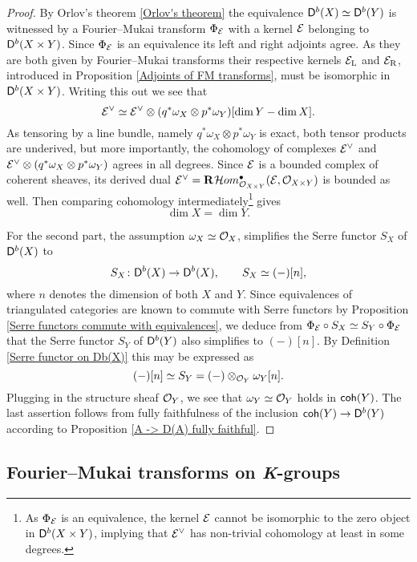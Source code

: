 \begin{proof}
    By Orlov's theorem \ref{Orlov's theorem} the equivalence $\mathsf{D}^b(X) \simeq \mathsf{D}^b(Y)$ is witnessed by a Fourier--Mukai transform $\Phi_{\mathcal E}$ with a kernel $\mathcal E$ belonging to $\mathsf{D}^b(X \times Y)$. Since $\Phi_{\mathcal E}$ is an equivalence its left and right adjoints agree. As they are both given by Fourier--Mukai transforms their respective kernels $\mathcal E_\mathrm{L}$ and $\mathcal E_\mathrm{R}$, introduced in Proposition \ref{Adjoints of FM transforms}, must be isomorphic in $\mathsf{D}^b(X \times Y)$. Writing this out we see that
    \[
        \mathcal E^\vee \simeq \mathcal E^\vee \otimes (q^*\omega_X \otimes p^*\omega_Y)[\dim Y - \dim X].
    \]
    As tensoring by a line bundle, namely $q^*\omega_X \otimes p^*\omega_Y$ is exact, both tensor products are underived, but more importantly, the cohomology of complexes $\mathcal E^\vee$ and ${\mathcal E^\vee \otimes (q^*\omega_X \otimes p^*\omega_Y)}$ agrees in all degrees. Since $\mathcal E$ is a bounded complex of coherent sheaves, its derived dual $\E^\vee = \rderived{}{\localhom[X \times Y]^\bullet(\E, \struct{X \times Y})}$ is bounded as well. Then comparing cohomology intermediately\footnote{As $\Phi_{\mathcal E}$ is an equivalence, the kernel $\mathcal E$ cannot be isomorphic to the zero object in $\mathsf{D}^b(X \times Y)$, implying that $\mathcal E^\vee$ has non-trivial cohomology at least in some degrees.} gives 
    \[
        \dim X = \dim Y.
    \]
    
    For the second part, the assumption $\omega_X \simeq {\mathcal{O}_{X}}$, simplifies the Serre functor $S_X$ of $\mathsf{D}^b(X)$ to 
    \[
        S_X \colon \mathsf{D}^b(X) \to \mathsf{D}^b(X), \qquad S_X \simeq (-)[n], 
    \]
    where $n$ denotes the dimension of both $X$ and $Y$. Since equivalences of triangulated categories are known to commute with Serre functors by Proposition \ref{Serre functors commute with equivalences}, we deduce from $\Phi_{\mathcal E} \circ S_X \simeq S_Y \circ \Phi_{\mathcal E}$ that the Serre functor $S_Y$ of $\mathsf{D}^b(Y)$ also simplifies to $(-)[n]$. By Definition \ref{Serre functor on Db(X)} this may be expressed as
    \[
        (-)[n] \simeq S_Y = (-) \otimes_{{\mathcal{O}_{Y}}} \omega_Y[n].
    \]
    Plugging in the structure sheaf ${\mathcal{O}_{Y}}$, we see that $\omega_Y \simeq {\mathcal{O}_{Y}}$ holds in $\mathsf{coh}(Y)$. The last assertion 
    follows from fully faithfulness of the inclusion $\mathsf{coh}(Y) \to \mathsf{D}^b(Y)$ according to Proposition \ref{A -> D(A) fully faithful}. 
\end{proof}

\subsection{Fourier--Mukai transforms on \emph{K}-groups}
\label{Subsection: FM transform on K-theory}

